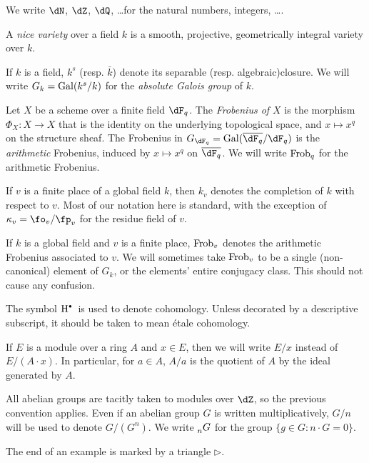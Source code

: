 \documentclass{article}
\begin{document}
We write $\dN$, $\dZ$, $\dQ$, \ldots for the natural numbers, integers, \ldots. 

A \emph{nice variety} over a field $k$ is a smooth, projective, geometrically 
integral variety over $k$. 

If $k$ is a field, $k^s$ (resp. $\bar k$) denote its separable (resp. 
algebraic)closure. We will write $G_k = \operatorname{Gal}(k^s/k)$ for the \emph{absolute 
Galois group} of $k$. 


Let $X$ be a scheme over a finite field $\dF_q$. The \emph{Frobenius of $X$} 
is the morphism $\Phi_X:X\to X$ that is the identity on the underlying 
topological space, and $x\mapsto x^q$ on the structure sheaf. The Frobenius in 
$G_{\dF_q} = \gal(\overline{\dF_q}/\dF_q)$ is the \emph{arithmetic} Frobenius, 
induced by $x\mapsto x^q$ on $\overline{\dF_q}$. We will write $\mathrm{Frob}_q$ for 
the arithmetic Frobenius. 

If $v$ is a finite place of a global field $k$, then $k_v$ denotes the 
completion of $k$ with respect to $v$. Most of our notation here is standard, 
with the exception of $\kappa_v=\fo_v/\fp_v$ for the residue field of $v$. 

If $k$ is a global field and $v$ is a finite place, $\mathrm{Frob}_v$ denotes the 
arithmetic Frobenius associated to $v$. We will sometimes take $\mathrm{Frob}_v$ to be 
a single (non-canonical) element of $G_k$, or the elements' entire conjugacy 
class. This should not cause any confusion. 

The symbol $\h^\bullet{}$ is used to denote cohomology. Unless decorated by a 
descriptive subscript, it should be taken to mean \'etale cohomology. 

If $E$ is a module over a ring $A$ and $x\in E$, then we will write $E/x$ 
instead of $E/(A\cdot x)$. In particular, for $a\in A$, $A/a$ is the quotient 
of $A$ by the ideal generated by $A$. 

All abelian groups are tacitly taken to modules over $\dZ$, so the previous 
convention applies. Even if an abelian group $G$ is written multiplicatively, 
$G/n$ will be used to denote $G/(G^n)$. We write $\prescript{}{n}{G}$ for the 
group $\{g\in G:n\cdot G=0\}$. 

The end of an example is marked by a triangle $\triangleright$. 
\end{document}
